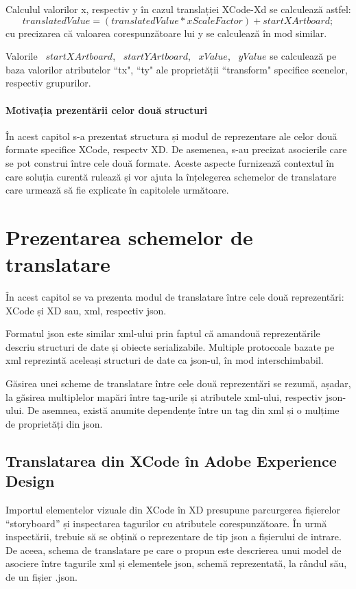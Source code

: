 Calculul valorilor x, respectiv y în cazul translației XCode-Xd se calculează astfel:
        \[ translatedValue = (translatedValue * xScaleFactor) + startXArtboard; \]
cu precizarea că valoarea corespunzătoare lui y se calculează în mod similar.

Valorile ~$startXArtboard$, ~$startYArtboard$, ~$xValue$, ~$yValue$ se calculează pe baza valorilor atributelor ``tx", ``ty" ale proprietății ``transform" specifice scenelor, respectiv grupurilor.

\subsubsection {Motivația prezentării celor două structuri} 

În acest capitol s-a prezentat structura și modul de reprezentare ale celor două formate specifice XCode, respectv XD. De asemenea, s-au precizat asocierile care se pot construi între cele două formate. Aceste aspecte furnizează contextul în care soluția curentă rulează și vor ajuta la înțelegerea schemelor de translatare care urmează să fie explicate în capitolele următoare.

\chapter{Prezentarea schemelor de translatare}

În acest capitol se va prezenta modul de translatare între cele două reprezentări: XCode și XD sau, xml, respectiv json. 

Formatul json este similar xml-ului prin faptul că amandouă reprezentările descriu structuri de date și obiecte serializabile. Multiple protocoale bazate pe xml reprezintă aceleași structuri de date ca json-ul, în mod interschimbabil.

Găsirea unei scheme de translatare între cele două reprezentări se rezumă, așadar, la găsirea multiplelor mapări între tag-urile și atributele xml-ului, respectiv json-ului. De asemnea, există anumite dependențe între un tag din xml și o mulțime de proprietăți din json.

\section{Translatarea din XCode în Adobe Experience Design}

Importul elementelor vizuale din XCode în XD presupune parcurgerea fișierelor “storyboard” și inspectarea tagurilor cu atributele corespunzătoare. În urmă inspectării, trebuie să se obțină o reprezentare de tip json a fișierului de intrare.  De aceea, schema de translatare pe care o propun este descrierea unui model de asociere între tagurile xml și elementele json, schemă reprezentată, la rândul său, de un fișier .json.  

